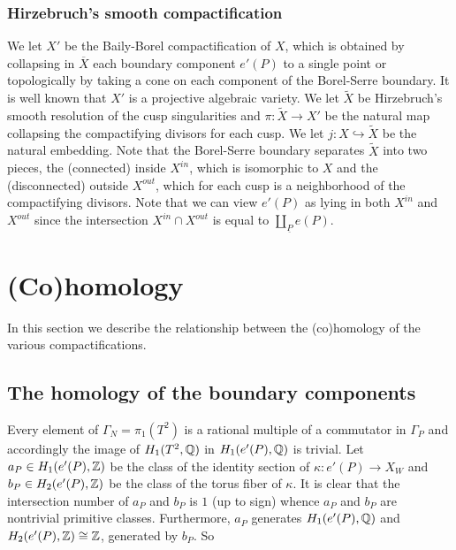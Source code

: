 \subsubsection{Hirzebruch's smooth compactification}\label{H-compact}

\vskip 0.3in 

We let $X'$ be the Baily-Borel compactification of $X$, which is
obtained by collapsing in $\overline{X}$ each boundary component
$e'(P)$ to a single point or topologically by taking a cone on each
component of the Borel-Serre boundary. It is well known that $X'$
is a projective algebraic variety. We let $\tilde{X}$ be Hirzebruch's
smooth resolution of the cusp singularities and $\pi:\tilde{X} \to
X'$ be the natural map collapsing the compactifying divisors for
each cusp. We let $j:X \hookrightarrow \tilde{X}$ be the natural
embedding. Note that the Borel-Serre boundary separates $\tilde{X}$
into two pieces, the (connected) inside $X^{in}$, which is isomorphic
to $X$ and the (disconnected) outside $X^{out}$, which for each
cusp is a neighborhood of the compactifying divisors. Note that we
can view $e'(P)$ as lying in both $X^{in}$ and $X^{out}$ since the
intersection $X^{in} \cap X^{out}$ is equal to $ \coprod_{\underline{P}}
e({P})$.


\vskip 0.3in 

\section{(Co)homology}

\vskip 0.3in 

In this section we describe the relationship between the (co)homology of the various
compactifications. 

\vskip 0.3in 

\subsection{The homology of the boundary components}\label{boundaryhom}

\vskip 0.3in 

Every element of $\Gamma_N =\pi_1(T^2)$ is a rational multiple of
a commutator in $\Gamma_P$ and accordingly the image of $H_1(T^2,\mathbb{Q})$
in $H_1(e'(P),\mathbb{Q})$ is trivial.
Let $a_P \in H_1(e'(P),\mathbb{Z})$ be the class of the identity section
of $\kappa:e'(P) \to X_W$ and $b_P \in H_2(e'(P),\mathbb{Z})$ be the class
of the torus fiber of $\kappa$. It is clear that the intersection
number of $a_P$ and $b_P$ is $1$ (up to sign) whence $a_P$ and $b_P$
are nontrivial primitive classes. Furthermore, $a_P$ generates
$H_1(e'(P),\mathbb{Q})$ and $ H_2(e'(P),\mathbb{Z})  \cong \mathbb{Z}$, generated by $b_P$.
So

